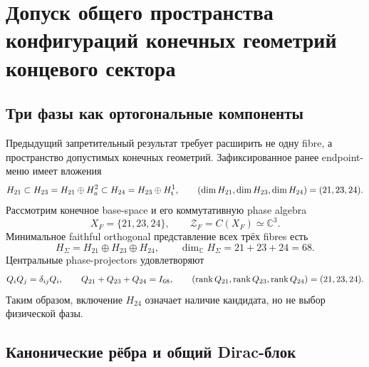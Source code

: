 \chapter{Допуск общего пространства конфигураций конечных геометрий концевого сектора}
\label{ch:v9-endpoint-finite-geometry-configuration-space}

\section{Три фазы как ортогональные компоненты}

Предыдущий запретительный результат требует расширить не одну fibre, а пространство допустимых
конечных геометрий. Зафиксированное ранее endpoint-меню имеет вложения
\begin{equation}
 H_{21}\subset H_{23}=H_{21}\oplus H_{\rm n}^{2}
 \subset H_{24}=H_{23}\oplus H_{\rm t}^{1},
 \qquad (\dim H_{21},\dim H_{23},\dim H_{24})=(21,23,24).
 \label{eq:v9-config-space-phase-chain}
\end{equation}
Рассмотрим конечное base-space и его коммутативную phase algebra
\begin{equation}
 X_F=\{21,23,24\},
 \qquad \mathcal Z_F=C(X_F)\simeq\mathbb C^3.
 \label{eq:v9-config-space-phase-algebra}
\end{equation}
Минимальное faithful orthogonal представление всех трёх fibres есть
\begin{equation}
 H_\Sigma=H_{21}\oplus H_{23}\oplus H_{24},
 \qquad \dim_{\mathbb C}H_\Sigma=21+23+24=68.
 \label{eq:v9-config-space-total-carrier}
\end{equation}
Центральные phase-projectors удовлетворяют
\begin{equation}
 Q_iQ_j=\delta_{ij}Q_i,
 \qquad Q_{21}+Q_{23}+Q_{24}=I_{68},
 \qquad (\operatorname{rank} Q_{21},\operatorname{rank} Q_{23},\operatorname{rank} Q_{24})=(21,23,24).
 \label{eq:v9-config-space-central-projectors}
\end{equation}
Таким образом, включение $H_{24}$ означает наличие кандидата, но не выбор
физической фазы.

\section{Канонические рёбра и общий Dirac-блок}

